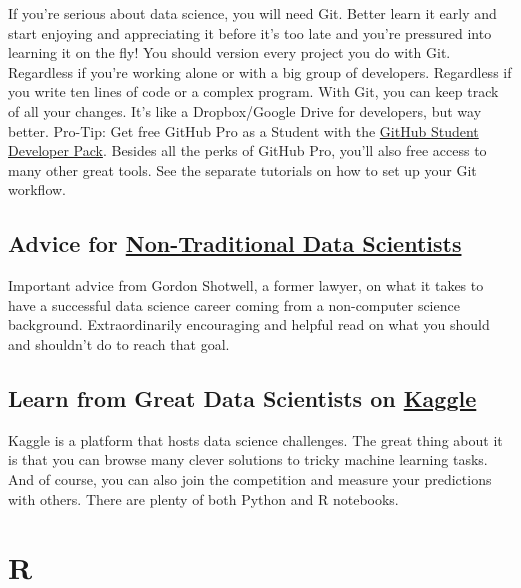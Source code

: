\documentclass[
  11pt,
]{book}
\begin{document}
If you're serious about data science, you will need Git. Better learn it early and start enjoying and appreciating it before it's too late and you're pressured into learning it on the fly! You should version every project you do with Git. Regardless if you're working alone or with a big group of developers. Regardless if you write ten lines of code or a complex program. With Git, you can keep track of all your changes. It's like a Dropbox/Google Drive for developers, but way better. Pro-Tip: Get free GitHub Pro as a Student with the \href{https://education.github.com/pack}{GitHub Student Developer Pack}. Besides all the perks of GitHub Pro, you'll also free access to many other great tools. See the separate tutorials on how to set up your Git workflow.

\hypertarget{advice-for-non-traditional-data-scientists}{%
\subsection*{\texorpdfstring{Advice for \href{https://blog.shotwell.ca/posts/learning_data_science/}{Non-Traditional Data Scientists}}{Advice for Non-Traditional Data Scientists}}\label{advice-for-non-traditional-data-scientists}}

Important advice from Gordon Shotwell, a former lawyer, on what it takes to have a successful data science career coming from a non-computer science background. Extraordinarily encouraging and helpful read on what you should and shouldn't do to reach that goal.

\hypertarget{learn-from-great-data-scientists-on-kaggle}{%
\subsection*{\texorpdfstring{Learn from Great Data Scientists on \href{https://www.kaggle.com/}{Kaggle}}{Learn from Great Data Scientists on Kaggle}}\label{learn-from-great-data-scientists-on-kaggle}}

Kaggle is a platform that hosts data science challenges. The great thing about it is that you can browse many clever solutions to tricky machine learning tasks. And of course, you can also join the competition and measure your predictions with others. There are plenty of both Python and R notebooks.

\hypertarget{r}{%
\section{R}\label{r}}
\end{document}
